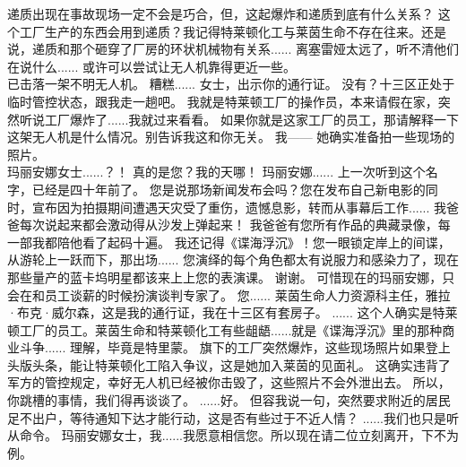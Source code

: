 \documentclass[openany]{book}
\begin{document}
\begin{dialogue}
     递质出现在事故现场一定不会是巧合，但，这起爆炸和递质到底有什么关系？
     这个工厂生产的东西会用到递质？我记得特莱顿化工与莱茵生命不存在往来。还是说，递质和那个砸穿了厂房的环状机械物有关系......
     离塞雷娅太远了，听不清他们在说什么......
     或许可以尝试让无人机靠得更近一些。
    \\
     已击落一架不明无人机。
     糟糕......
     女士，出示你的通行证。
     没有？十三区正处于临时管控状态，跟我走一趟吧。
     我就是特莱顿工厂的操作员，本来请假在家，突然听说工厂爆炸了......我就过来看看。
     如果你就是这家工厂的员工，那请解释一下这架无人机是什么情况。别告诉我这和你无关。
     我——
     她确实准备拍一些现场的照片。
    \\
     玛丽安娜女士......？！
     真的是您？我的天哪！
     玛丽安娜......
     上一次听到这个名字，已经是四十年前了。
     您是说那场新闻发布会吗？您在发布自己新电影的同时，宣布因为拍摄期间遭遇天灾受了重伤，遗憾息影，转而从事幕后工作......
     我爸爸每次说起来都会激动得从沙发上弹起来！
     我爸爸有您所有作品的典藏录像，每一部我都陪他看了起码十遍。
     我还记得《谍海浮沉》！您一眼锁定岸上的间谍，从游轮上一跃而下，那出场......
     您演绎的每个角色都太有说服力和感染力了，现在那些量产的蓝卡坞明星都该来上上您的表演课。
     谢谢。
     可惜现在的玛丽安娜，只会在和员工谈薪的时候扮演谈判专家了。
     您......
     莱茵生命人力资源科主任，雅拉·布克·威尔森，这是我的通行证，我在十三区有套房子。
     ......
     这个人确实是特莱顿工厂的员工。莱茵生命和特莱顿化工有些龃龉......就是《谍海浮沉》里的那种商业斗争......
     理解，毕竟是特里蒙。
     旗下的工厂突然爆炸，这些现场照片如果登上头版头条，能让特莱顿化工陷入争议，这是她加入莱茵的见面礼。
     这确实违背了军方的管控规定，幸好无人机已经被你击毁了，这些照片不会外泄出去。
     所以，你跳槽的事情，我们得再谈谈了。
     ......好。
     但容我说一句，突然要求附近的居民足不出户，等待通知下达才能行动，这是否有些过于不近人情？
     ......我们也只是听从命令。
     玛丽安娜女士，我......我愿意相信您。所以现在请二位立刻离开，下不为例。

\end{dialogue}
\end{document}
